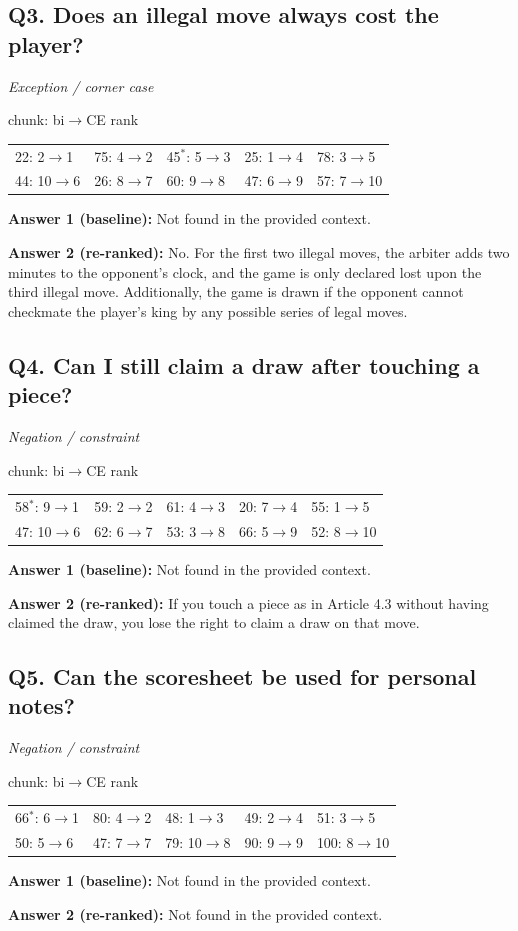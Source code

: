 \subsection*{Q3. Does an illegal move always cost the player?}
\emph{Exception / corner case}\par
{\small chunk: bi$\to$CE rank\par\smallskip \begin{tabular}{@{}lllll@{}}
22: 2$\to$1 & 75: 4$\to$2 & 45$^*$: 5$\to$3 & 25: 1$\to$4 & 78: 3$\to$5 \\
44: 10$\to$6 & 26: 8$\to$7 & 60: 9$\to$8 & 47: 6$\to$9 & 57: 7$\to$10
\end{tabular}}\par\smallskip
\textbf{Answer 1 (baseline):} Not found in the provided context.\par
\textbf{Answer 2 (re-ranked):} No. For the first two illegal moves, the arbiter adds two minutes to the opponent's clock, and the game is only declared lost upon the third illegal move. Additionally, the game is drawn if the opponent cannot checkmate the player’s king by any possible series of legal moves.\par

\subsection*{Q4. Can I still claim a draw after touching a piece?}
\emph{Negation / constraint}\par
{\small chunk: bi$\to$CE rank\par\smallskip \begin{tabular}{@{}lllll@{}}
58$^*$: 9$\to$1 & 59: 2$\to$2 & 61: 4$\to$3 & 20: 7$\to$4 & 55: 1$\to$5 \\
47: 10$\to$6 & 62: 6$\to$7 & 53: 3$\to$8 & 66: 5$\to$9 & 52: 8$\to$10
\end{tabular}}\par\smallskip
\textbf{Answer 1 (baseline):} Not found in the provided context.\par
\textbf{Answer 2 (re-ranked):} If you touch a piece as in Article 4.3 without having claimed the draw, you lose the right to claim a draw on that move.\par

\subsection*{Q5. Can the scoresheet be used for personal notes?}
\emph{Negation / constraint}\par
{\small chunk: bi$\to$CE rank\par\smallskip \begin{tabular}{@{}lllll@{}}
66$^*$: 6$\to$1 & 80: 4$\to$2 & 48: 1$\to$3 & 49: 2$\to$4 & 51: 3$\to$5 \\
50: 5$\to$6 & 47: 7$\to$7 & 79: 10$\to$8 & 90: 9$\to$9 & 100: 8$\to$10
\end{tabular}}\par\smallskip
\textbf{Answer 1 (baseline):} Not found in the provided context.\par
\textbf{Answer 2 (re-ranked):} Not found in the provided context.\par

